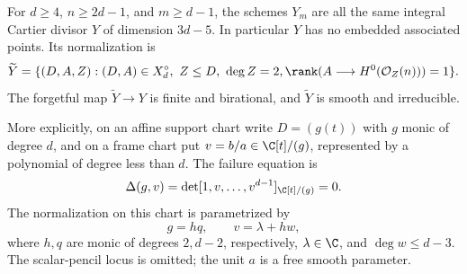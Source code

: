 \begin{theorem}
\label{thm:moving-normalization}
For $d\ge4$, $n\ge2d-1$, and $m\ge d-1$, the schemes $Y_m$
are all the same integral Cartier divisor $Y$ of dimension $3d-5$.
In particular $Y$ has no embedded associated points. Its normalization is
\begin{equation}\label{eq:contact-normalization-incidence}
 \widetilde Y=
 \{(D,A,Z): (D,A)\in X_d^\circ,\ Z\le D,\ \deg Z=2,
                  \rank(A\longrightarrow H^0(\mathcal O_Z(n)))=1\}.
\end{equation}
The forgetful map $\widetilde Y\to Y$ is finite and birational,
and $\widetilde Y$ is smooth and irreducible.

More explicitly, on an affine support chart write $D=(g(t))$ with
$g$ monic of degree $d$, and on a frame chart put $v=b/a\in\C[t]/(g)$,
represented by a polynomial of degree less than $d$. The failure
equation is
\begin{equation}\label{eq:moving-power-determinant}
 \Delta(g,v)=\det[1,v,\ldots,v^{d-1}]_{\C[t]/(g)}=0.
\end{equation}
The normalization on this chart is parametrized by
\begin{equation}\label{eq:moving-explicit-normalization}
 g=hq,\qquad v=\lambda+hw,
\end{equation}
where $h,q$ are monic of degrees $2,d-2$, respectively,
$\lambda\in\C$, and $\deg w\le d-3$. The scalar-pencil locus
is omitted; the unit $a$ is a free smooth parameter.
\end{theorem}
